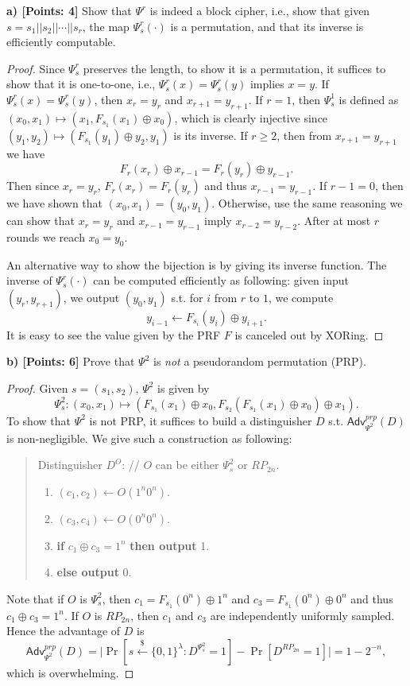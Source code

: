 \documentclass[12pt]{article}
\newcommand{\bits}{\{0,1\}}
\newcommand{\getsr}{\stackrel{\$}{\gets}}
\newcommand{\Adv}{\textsf{Adv}}
\theoremstyle{definition}
\begin{document}
{\bf a) [Points: 4]} Show that $\Psi^r$ is indeed a block cipher, i.e., show that given $s = s_1 || s_2 || \cdots || s_r$, the map $\Psi_s^r(\cdot)$ is a permutation, and that its inverse is efficiently computable.

\begin{proof}
Since $\Psi_s^r$ preserves the length, to show it is a permutation, it suffices to show that it is one-to-one, i.e., $\Psi_s^r(x) = \Psi_s^r(y)$ implies $x = y$. If $\Psi_s^r(x) = \Psi_s^r(y)$, then $x_r = y_r$ and $x_{r+1} = y_{r+1}$. If $r=1$, then $\Psi_s^1$ is defined as $(x_0, x_1) \mapsto (x_1, F_{s_1}(x_1) \oplus x_{0})$, which is clearly injective since $(y_1,y_2) \mapsto (F_{s_1}(y_1)\oplus y_2, y_1)$ is its inverse. If $r \geq 2$, then from $x_{r+1} = y_{r+1}$ we have
$$F_{r}(x_{r}) \oplus x_{r-1} = F_{r}(y_{r}) \oplus y_{r-1}.$$ 
Then since $x_r = y_r$, $F_r(x_r) = F_r(y_r)$ and thus $x_{r-1} = y_{r-1}$. If $r-1=0$, then we have shown that $(x_0,x_1) = (y_0, y_1)$. Otherwise, use the same reasoning we can show that $x_{r} = y_{r}$ and $x_{r-1} = y_{r-1}$ imply $x_{r-2} = y_{r-2}$. After at most $r$ rounds we reach $x_0 = y_0$.

An alternative way to show the bijection is by giving its inverse function. The inverse of $\Psi_s^r(\cdot)$ can be computed efficiently as following: given input $(y_r, y_{r+1})$, we output $(y_0, y_1)$ s.t. for $i$ from $r$ to $1$, we compute
$$y_{i-1} \gets F_{s_i}(y_i) \oplus y_{i+1}.$$
It is easy to see the value given by the PRF $F$ is canceled out by XORing.
\end{proof}

{\bf b) [Points: 6]} Prove that $\Psi^2$ is \emph{not} a pseudorandom permutation (PRP).
\begin{proof}
Given $s = (s_1, s_2)$, $\Psi^2$ is given by 
$$\Psi_s^2 : (x_0,x_1) \mapsto (F_{s_1}(x_1) \oplus x_{0}, F_{s_2}(F_{s_1}(x_1) \oplus x_{0}) \oplus x_1).$$
To show that $\Psi^2$ is not PRP, it suffices to build a distinguisher $D$ s.t. $\Adv_{\Psi^2}^{prp}(D)$ is non-negligible. We give such a construction as following:
\begin{quote}
Distinguisher $D^O$: // $O$ can be either $\Psi_s^2$ or $RP_{2n}$.
\begin{enumerate}
\item $(c_1,c_2) \gets O(1^n0^n)$.
\item $(c_3,c_4) \gets O(0^n0^n)$.
\item {\bf if} $c_1 \oplus c_3 = 1^n$ {\bf then output} 1.
\item {\bf else output} 0.
\end{enumerate}
\end{quote}
Note that if $O$ is $\Psi_s^2$, then $c_1 = F_{s_1}(0^n) \oplus 1^n$ and $c_3 = F_{s_1}(0^n) \oplus 0^n$ and thus $c_1 \oplus c_3 = 1^n$. If $O$ is $RP_{2n}$, then $c_1$ and $c_3$ are independently uniformly sampled. Hence the advantage of $D$ is
$$\Adv_{\Psi^2}^{prp}(D) = \bigg| \Pr[s \getsr \bits^\lambda : D^{\Psi_s^2} = 1] - \Pr[D^{RP_{2n}}=1] \bigg| = 1 - 2^{-n},$$
which is overwhelming.
\end{proof}
\end{document}
